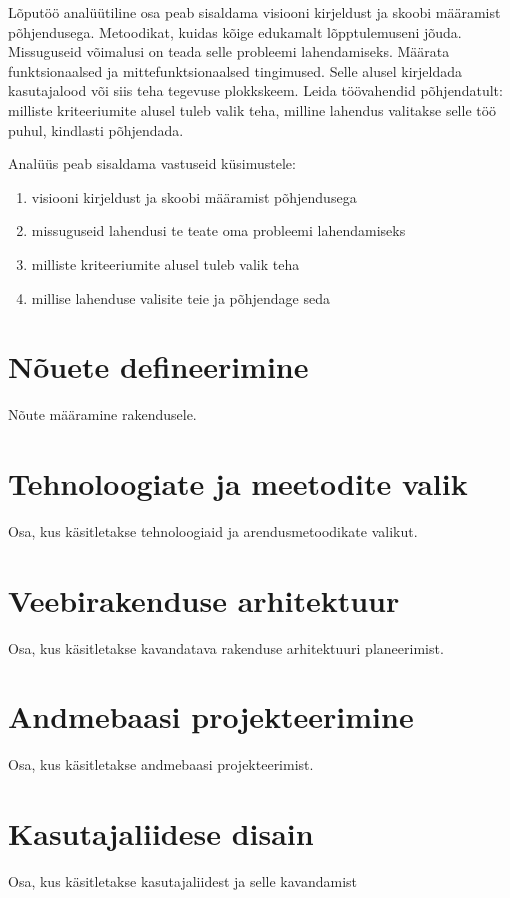 Lõputöö analüütiline osa peab sisaldama visiooni kirjeldust ja skoobi
määramist põhjendusega. Metoodikat, kuidas kõige edukamalt lõpptulemuseni
jõuda. Missuguseid võimalusi on teada selle probleemi lahendamiseks. Määrata
funktsionaalsed ja mittefunktsionaalsed tingimused. Selle alusel kirjeldada
kasutajalood või siis teha tegevuse plokkskeem. Leida töövahendid
põhjendatult: milliste kriteeriumite alusel tuleb valik teha, milline lahendus
valitakse selle töö puhul, kindlasti põhjendada.

Analüüs peab sisaldama vastuseid küsimustele:
\begin{enumerate}
    \item visiooni kirjeldust ja skoobi määramist põhjendusega
    \item missuguseid lahendusi te teate oma probleemi lahendamiseks
    \item milliste kriteeriumite alusel tuleb valik teha
    \item millise lahenduse valisite teie ja põhjendage seda
\end{enumerate}

\section{Nõuete defineerimine}
Nõute määramine rakendusele.

\section{Tehnoloogiate ja meetodite valik}
Osa, kus käsitletakse tehnoloogiaid ja arendusmetoodikate valikut.

\section{Veebirakenduse arhitektuur}
Osa, kus käsitletakse kavandatava rakenduse arhitektuuri planeerimist.

\section{Andmebaasi projekteerimine}
Osa, kus käsitletakse andmebaasi projekteerimist.

\section{Kasutajaliidese disain}
Osa, kus käsitletakse kasutajaliidest ja selle kavandamist